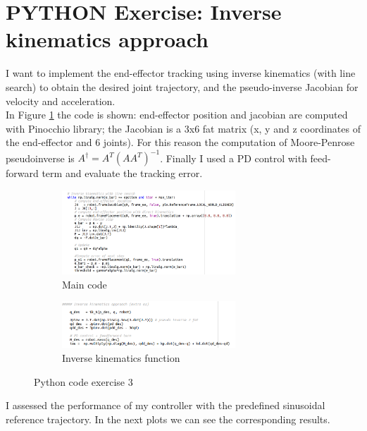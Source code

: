 \documentclass[11pt,a4paper]{article}
\begin{document}
\section{PYTHON Exercise: Inverse kinematics approach}	
I want to implement the end-effector tracking using inverse kinematics (with line search) to obtain the desired joint trajectory, and the pseudo-inverse Jacobian for velocity and acceleration. \\
In Figure \ref{codici} the code is shown: end-effector position and jacobian are computed with Pinocchio library; the Jacobian is a 3x6 fat matrix (x, y and z coordinates of the end-effector and 6 joints). For this reason the computation of Moore-Penrose pseudoinverse is $A^\dagger=A^T(AA^T)^{-1}$. Finally I used a PD control with feed-forward term and evaluate the tracking error.  
\begin{figure}[H]
	\begin{subfigure}[b]{0.5\textwidth}
		\centering
		\includegraphics[width=65mm]{images/cod2_es3.png}
		\caption{Main code}
	\end{subfigure}
	\begin{subfigure}[b]{0.5\textwidth}
		\centering
		\includegraphics[width=65mm]{images/cod1_es3.png}
		\caption{Inverse kinematics function}
	\end{subfigure}
	\caption{Python code exercise 3}
	\label{codici}
\end{figure}

I assessed the performance of my controller with the predefined sinusoidal reference trajectory. In the next plots we can see the corresponding results.
\end{document}
